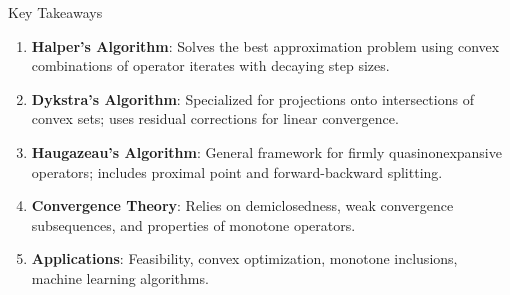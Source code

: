 \documentclass[aspectratio=169,10pt]{beamer}
\begin{document}

\begin{frame}{Key Takeaways}
  \begin{enumerate}
    \item \textbf{Halper's Algorithm}: Solves the best approximation problem using convex combinations of operator iterates with decaying step sizes.

    \vspace{0.3cm}

    \item \textbf{Dykstra's Algorithm}: Specialized for projections onto intersections of convex sets; uses residual corrections for linear convergence.

    \vspace{0.3cm}

    \item \textbf{Haugazeau's Algorithm}: General framework for firmly quasinonexpansive operators; includes proximal point and forward-backward splitting.

    \vspace{0.3cm}

    \item \textbf{Convergence Theory}: Relies on demiclosedness, weak convergence subsequences, and properties of monotone operators.

    \vspace{0.3cm}

    \item \textbf{Applications}: Feasibility, convex optimization, monotone inclusions, machine learning algorithms.
  \end{enumerate}
\end{frame}

\end{document}
